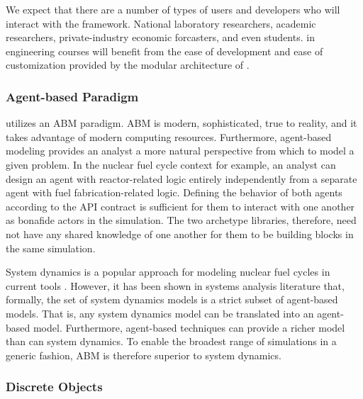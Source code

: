 We expect that there are a number of types of users and developers who will 
interact with the \Cyclus framework. National laboratory researchers,
academic researchers, private-industry economic forcasters, and even students. 
in engineering courses will benefit from the ease of development and ease of 
customization provided by the modular architecture of \Cyclus.

\subsubsection{Agent-based Paradigm}

\Cyclus utilizes an \gls{ABM} paradigm.  \gls{ABM} is modern, sophisticated, 
true to reality, and it takes advantage of modern computing resources.  
Furthermore, agent-based modeling provides an analyst a more natural 
perspective from which to model a given problem. In the nuclear fuel cycle 
context for example, an analyst can design an agent with reactor-related logic 
entirely independently from a separate agent with fuel fabrication-related 
logic. Defining the behavior of both agents according to the 
\gls{API} contract is sufficient for them to interact with one another as 
bonafide actors in the simulation.  The two archetype libraries, therefore, need 
not have any shared knowledge of one another for them to be building blocks in 
the same simulation.

System dynamics is a popular approach for modeling nuclear fuel cycles in current
tools \cite{VISION,CAFCA}. However, it has been shown in systems analysis literature
\cite{macal_agent-based_2010} that, formally, the
set of system dynamics models is a strict subset of agent-based models.
That is, any system dynamics model can be translated
into an agent-based model. Furthermore, agent-based
techniques can provide a richer model than can system dynamics. To enable the 
broadest range of simulations in a generic fashion, \gls{ABM} is therefore 
superior to system dynamics. 

\subsubsection{Discrete Objects}


